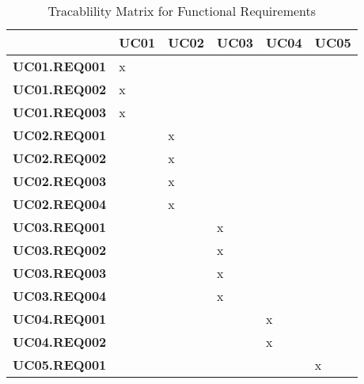 \begin{comment}
\vspace{5mm}

\begin{tabular}{ |p{2cm}||p{9cm}| }
    \hline
    ID & \textbf{UC01.REQ001}\\ \hline
    Category & functional \\ \hline
    Description & 

    \\ \hline
    Rationale & \\ \hline 
    Source & \\ \hline
\end{tabular}  
\end{comment}

\begin{flushleft}

\vspace{5mm}

\begin{table}[H]    
    \begin{tabular}{|p{3cm}|p{2cm}|p{2cm}|p{2cm}|p{2cm}|p{2cm}|} 
        \hline & \textbf{UC01} & \textbf{UC02} & \textbf{UC03} & \textbf{UC04} & \textbf{UC05} \\ \hline
        \textbf{UC01.REQ001} & x &  &  &  &  \\ \hline
        \textbf{UC01.REQ002} & x &  &  &  &  \\ \hline
        \textbf{UC01.REQ003} & x &  &  &  &  \\ \hline
        \textbf{UC02.REQ001} &  & x &  &  &  \\ \hline
        \textbf{UC02.REQ002} &  & x &  &  &  \\ \hline
        \textbf{UC02.REQ003} &  & x &  &  &  \\ \hline
        \textbf{UC02.REQ004} &  & x &  &  &  \\ \hline
        \textbf{UC03.REQ001} &  &  & x &  &  \\ \hline
        \textbf{UC03.REQ002} &  &  & x &  &  \\ \hline
        \textbf{UC03.REQ003} &  &  & x &  &  \\ \hline
        \textbf{UC03.REQ004} &  &  & x &  &  \\ \hline
        \textbf{UC04.REQ001} &  &  &  & x &  \\ \hline
        \textbf{UC04.REQ002} &  &  &  & x &  \\ \hline
        \textbf{UC05.REQ001} &  &  &  &  & x \\ \hline
    \end{tabular}
    \caption{Tracablility Matrix for Functional Requirements}
\end{table}

\end{flushleft}
